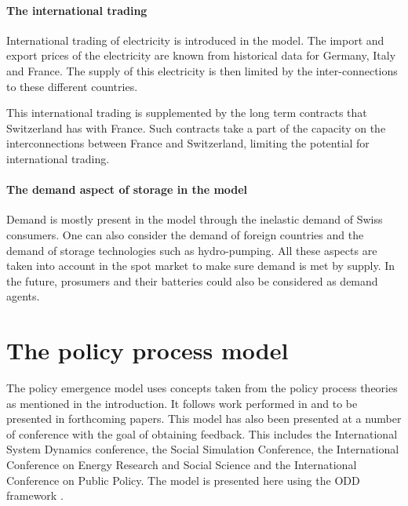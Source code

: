 \paragraph{The international trading}

International trading of electricity is introduced in the model. The import and export prices of the electricity are known from historical data for Germany, Italy and France. The supply of this electricity is then limited by the inter-connections to these different countries.

This international trading is supplemented by the long term contracts that Switzerland has with France. Such contracts take a part of the capacity on the interconnections between France and Switzerland, limiting the potential for international trading. 

\paragraph{The demand aspect of storage in the model} 

Demand is mostly present in the model through the inelastic demand of Swiss consumers. One can also consider the demand of foreign countries and the demand of storage technologies such as hydro-pumping. All these aspects are taken into account in the spot market to make sure demand is met by supply. In the future, prosumers and their batteries could also be considered as demand agents. 






\section{The policy process model}
\label{sec:CodeDocPolicy}

The policy emergence model uses concepts taken from the policy process theories as mentioned in the introduction. It follows work performed in \cite{klein2017emergence} and to be presented in forthcoming papers. This model has also been presented at a number of conference with the goal of obtaining feedback. This includes the International System Dynamics conference, the Social Simulation Conference, the International Conference on Energy Research and Social Science and the International Conference on Public Policy. The model is presented here using the ODD framework \citep{grimm2010odd}.

